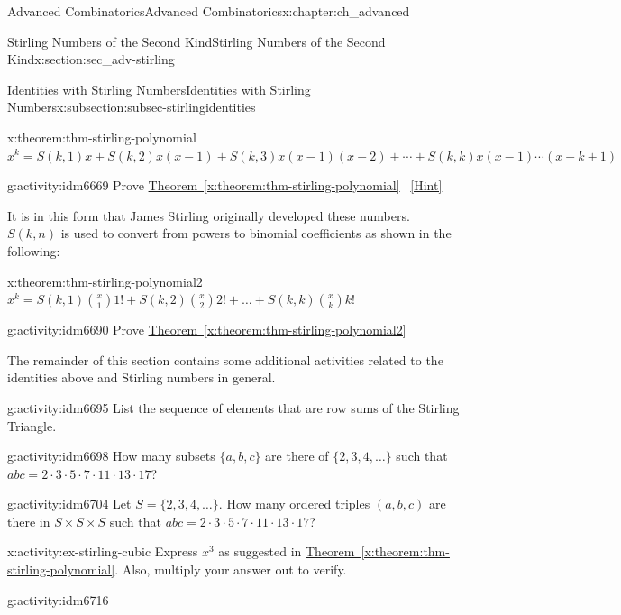 \documentclass[oneside,10pt,]{book}
\numberwithin{equation}{chapter}
\begin{document}
\begin{chapterptx}{Advanced Combinatorics}{}{Advanced Combinatorics}{}{}{x:chapter:ch_advanced}
\begin{sectionptx}{Stirling Numbers of the Second Kind}{}{Stirling Numbers of the Second Kind}{}{}{x:section:sec_adv-stirling}
\begin{subsectionptx}{Identities with Stirling Numbers}{}{Identities with Stirling Numbers}{}{}{x:subsection:subsec-stirlingidentities}
\begin{theorem}{}{}{x:theorem:thm-stirling-polynomial}%
\(x^{k} = S\left(k,1 \right)x + S\left(k,2 \right)x\left( x - 1 \right) + S\left(k,3 \right)x\left( x - 1 \right)\left( x - 2 \right) + \cdots
+ S\left(k,k \right)x\left( x - 1 \right)\cdots(x -k + 1)\)%
\end{theorem}
\begin{activity}{}{g:activity:idm6669}%
Prove \hyperref[x:theorem:thm-stirling-polynomial]{Theorem~\ref{x:theorem:thm-stirling-polynomial}}%
\qquad~\hfill{\tiny\hyperlink{g:hint:idm6673-back}{[Hint]}}\end{activity}
It is in this form that James Stirling originally developed these numbers. \(S(k,n)\) is used to convert from powers to binomial  coefficients as shown in the following:%
\begin{theorem}{}{}{x:theorem:thm-stirling-polynomial2}%
\(x^{k} = S\left(k,1 \right)\binom{x}{1}1! + S\left(k,2 \right) \binom{x}{2}2! + \ldots + S\left(k,k \right)\binom{x}{k} k!\)%
\end{theorem}
\begin{activity}{}{g:activity:idm6690}%
Prove \hyperref[x:theorem:thm-stirling-polynomial2]{Theorem~\ref{x:theorem:thm-stirling-polynomial2}}%
\end{activity}
The remainder of this section contains some additional activities related to the identities above and Stirling numbers in general.%
\begin{activity}{}{g:activity:idm6695}%
List the sequence of elements that are row sums of the Stirling Triangle.%
\end{activity}
\begin{activity}{}{g:activity:idm6698}%
How many subsets \(\{a,b,c\}\) are there of \(\{2,3,4,\ldots\}\) such that \(abc = 2 \cdot 3 \cdot 5 \cdot 7 \cdot 11 \cdot 13 \cdot 17\)?%
\end{activity}
\begin{activity}{}{g:activity:idm6704}%
Let \(S = \{2,3,4,\ldots\}\).  How many ordered triples \((a,b,c)\) are there in \(S\times S \times S\) such that \(abc = 2 \cdot 3 \cdot 5 \cdot 7 \cdot 11 \cdot 13 \cdot 17\)?%
\end{activity}
\begin{activity}{}{x:activity:ex-stirling-cubic}%
Express \(x^3\) as suggested in \hyperref[x:theorem:thm-stirling-polynomial]{Theorem~\ref{x:theorem:thm-stirling-polynomial}}.  Also, multiply your answer out to verify.%
\end{activity}
\begin{activity}{}{g:activity:idm6716}%

\end{activity}
\end{subsectionptx}
\end{sectionptx}
\end{chapterptx}
\end{document}
